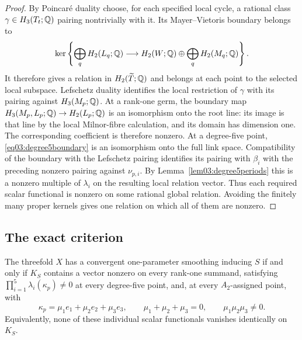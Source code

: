 \begin{proof}
By Poincar\'e duality choose, for each specified local cycle, a
rational class $\gamma\in H_3(T_t;\mathbb{Q})$ pairing nontrivially
with it.
Its Mayer--Vietoris boundary belongs to
\[
 \ker\left\{\bigoplus_q H_2(L_q;\mathbb{Q})
 \longrightarrow H_2(W;\mathbb{Q})\oplus\bigoplus_qH_2(M_q;\mathbb{Q})\right\}.
\]
It therefore gives a relation in $H_2(\widetilde T;\mathbb{Q})$ and
belongs at each point to the selected local subspace.
Lefschetz duality identifies the local restriction of $\gamma$
with its pairing against $H_3(M_p;\mathbb{Q})$.  At a rank-one germ,
the boundary map
$H_3(M_p,L_p;\mathbb{Q})\to H_2(L_p;\mathbb{Q})$ is an isomorphism onto the
root line: its image is that line by the local Milnor-fibre
calculation, and its domain has dimension one.  The corresponding
coefficient is therefore nonzero.  At a degree-five point,
\eqref{eq03:degree5boundary} is an isomorphism onto the full
link space.  Compatibility of the boundary with the Lefschetz
pairing identifies its pairing with $\beta_i$ with the preceding
nonzero pairing against $\nu_{p,i}$.  By
Lemma~\ref{lem03:degree5periods} this is a nonzero multiple of
$\lambda_i$ on the resulting local relation vector.
Thus each required scalar functional is nonzero on some rational
global relation.  Avoiding the finitely many proper kernels gives
one relation on which all of them are nonzero.
\end{proof}

\subsection{The exact criterion}

\begin{theorem}\label{thm04:criterion}
The threefold $X$ has a convergent one-parameter smoothing inducing
$S$ if and only if $K_S$ contains a vector nonzero on every
rank-one summand, satisfying $\prod_{i=1}^5\lambda_i(\kappa_p)\ne0$
at every degree-five point, and, at every $A_2$-assigned point, with
\[
 \kappa_p=\mu_1e_1+\mu_2e_2+\mu_3e_3,\qquad
 \mu_1+\mu_2+\mu_3=0,\qquad \mu_1\mu_2\mu_3\ne0.
\]
Equivalently, none of these individual scalar functionals vanishes
identically on $K_S$.
\end{theorem}

